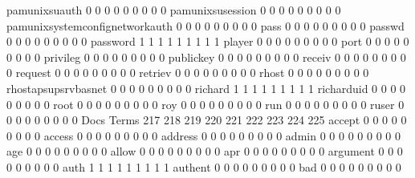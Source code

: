 \documentclass[compress,8pt]{beamer}
\begin{document}
\begin{frame}
\begin{Schunk}
  pamunixsuauth                              0   0   0   0   0   0   0   0   0
  pamunixsusession                           0   0   0   0   0   0   0   0   0
  pamunixsystemconfignetworkauth             0   0   0   0   0   0   0   0   0
  pass                                       0   0   0   0   0   0   0   0   0
  passwd                                     0   0   0   0   0   0   0   0   0
  password                                   1   1   1   1   1   1   1   1   1
  player                                     0   0   0   0   0   0   0   0   0
  port                                       0   0   0   0   0   0   0   0   0
  privileg                                   0   0   0   0   0   0   0   0   0
  publickey                                  0   0   0   0   0   0   0   0   0
  receiv                                     0   0   0   0   0   0   0   0   0
  request                                    0   0   0   0   0   0   0   0   0
  retriev                                    0   0   0   0   0   0   0   0   0
  rhost                                      0   0   0   0   0   0   0   0   0
  rhostapsupsrvbasnet                        0   0   0   0   0   0   0   0   0
  richard                                    1   1   1   1   1   1   1   1   1
  richarduid                                 0   0   0   0   0   0   0   0   0
  root                                       0   0   0   0   0   0   0   0   0
  roy                                        0   0   0   0   0   0   0   0   0
  run                                        0   0   0   0   0   0   0   0   0
  ruser                                      0   0   0   0   0   0   0   0   0
                                          Docs
Terms                                      217 218 219 220 221 222 223 224 225
  accept                                     0   0   0   0   0   0   0   0   0
  access                                     0   0   0   0   0   0   0   0   0
  address                                    0   0   0   0   0   0   0   0   0
  admin                                      0   0   0   0   0   0   0   0   0
  age                                        0   0   0   0   0   0   0   0   0
  allow                                      0   0   0   0   0   0   0   0   0
  apr                                        0   0   0   0   0   0   0   0   0
  argument                                   0   0   0   0   0   0   0   0   0
  auth                                       1   1   1   1   1   1   1   1   1
  authent                                    0   0   0   0   0   0   0   0   0
  bad                                        0   0   0   0   0   0   0   0   0

\end{Schunk}
\end{frame}
\end{document}
